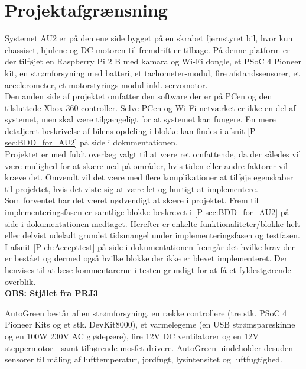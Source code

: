 \chapter{Projektafgrænsning} \label{ch:Projektafgraensning}

Systemet AU2 er på den ene side bygget på en skrabet fjernstyret bil, hvor kun chassiset, hjulene og DC-motoren til fremdrift er tilbage. På denne platform er der tilføjet en Raspberry Pi 2 B med kamara og Wi-Fi dongle, et PSoC 4 Pioneer kit, en strømforsyning med batteri, et tachometer-modul, fire afstandssensorer, et accelerometer, et motorstyrings-modul inkl. servomotor. \\
Den anden side af projektet omfatter den software der er på PCen og den tilsluttede Xbox-360 controller. 
Selve PCen og Wi-Fi netværket er ikke en del af systemet, men skal være tilgængeligt for at systemet kan fungere. En mere detaljeret beskrivelse af bilens opdeling i blokke kan findes i afsnit \ref{P-sec:BDD_for_AU2}  på side \pageref{P-sec:BDD_for_AU2} i dokumentationen.\\

Projektet er med fuldt overlæg valgt til at være ret omfattende, da der således vil være mulighed for at skære ned på områder, hvis tiden eller andre faktorer vil kræve det. Omvendt vil det være med flere komplikationer at tilføje egenskaber til projektet, hvis det viste sig at være let og hurtigt at implementere.\\
Som forventet har det været nødvendigt at skære i projektet. Frem til implementeringsfasen er samtlige blokke beskrevet i \ref{P-sec:BDD_for_AU2}  på side \pageref{P-sec:BDD_for_AU2} i dokumentationen medtaget. Herefter er enkelte funktionaliteter/blokke helt eller delvist udeladt grundet tidsmangel under implementeringsfasen og testfasen. I afsnit \ref{P-ch:Accepttest}  på side \pageref{P-ch:Accepttest} i dokumentationen fremgår det hvilke krav der er bestået og dermed også hvilke blokke der ikke er blevet implementeret. Der henvises til at læse kommentarerne i testen grundigt for at få et fyldestgørende overblik.\\

\textbf{OBS: Stjålet fra PRJ3}

AutoGreen består af en strømforsyning, en række controllere (tre stk. PSoC 4 Pioneer Kits og et stk. DevKit8000), et varmelegeme (en USB strømspareskinne og en 100W 230V AC glødepære), fire 12V DC ventilatorer og en 12V steppermotor - samt tilhørende mosfet drivere. 
AutoGreen uindeholder desuden sensorer til måling af lufttemperatur, jordfugt, lysintensitet og luftfugtighed.

